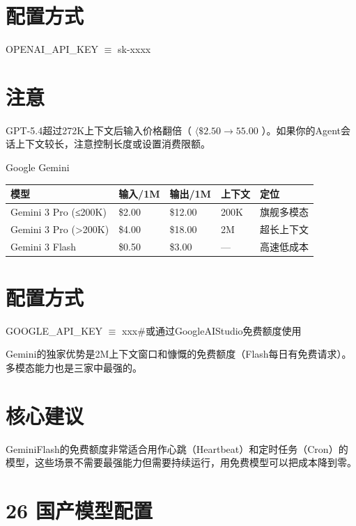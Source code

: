 \documentclass[
  10
]{article}
\newcounter{none} %
\begin{document}
\section{配置方式}\label{ux914dux7f6eux65b9ux5f0f-1}

OPENAI\_API\_KEY \(\equiv\) sk-xxxx

\section{注意}\label{ux6ce8ux610f-15}

GPT-5.4超过272K上下文后输入价格翻倍（ \(\langle \$ 2.50\to 55.00\)
）。如果你的Agent会话上下文较长，注意控制长度或设置消费限额。

Google Gemini

{\def\LTcaptype{none} %
\begin{longtable}[]{@{}|l|l|l|l|l|@{}}
\toprule\noalign{}
\endhead
\bottomrule\noalign{}
\endlastfoot
\hline
模型 & 输入/1M & 输出/1M & 上下文 & 定位 \\
\hline
Gemini 3 Pro (≤200K) & \$2.00 & \$12.00 & 200K & 旗舰多模态 \\
\hline
Gemini 3 Pro (\textgreater200K) & \$4.00 & \$18.00 & 2M & 超长上下文 \\
\hline
Gemini 3 Flash & \$0.50 & \$3.00 & --- & 高速低成本 \\
\hline
\end{longtable}
}

\section{配置方式}\label{ux914dux7f6eux65b9ux5f0f-2}

GOOGLE\_API\_KEY \(\equiv\) xxx\#或通过GoogleAIStudio免费额度使用

Gemini的独家优势是2M上下文窗口和慷慨的免费额度（Flash每日有免费请求）。多模态能力也是三家中最强的。

\section{核心建议}\label{ux6838ux5fc3ux5efaux8bae-17}

GeminiFlash的免费额度非常适合用作心跳（Heartbeat）和定时任务（Cron）的模型，这些场景不需要最强能力但需要持续运行，用免费模型可以把成本降到零。

\section{26 国产模型配置}\label{ux56fdux4ea7ux6a21ux578bux914dux7f6e}
\end{document}
